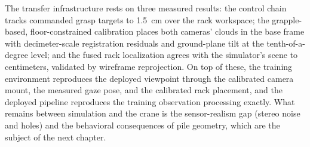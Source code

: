 The transfer infrastructure rests on three measured results: the control
chain tracks commanded grasp targets to 1.5~cm over the rack workspace; the
grapple-based, floor-constrained calibration places both cameras' clouds in
the base frame with decimeter-scale registration residuals and ground-plane
tilt at the tenth-of-a-degree level; and the fused rack localization agrees
with the simulator's scene to centimeters, validated by wireframe
reprojection. On top of these, the training environment reproduces the
deployed viewpoint through the calibrated camera mount, the measured gaze
pose, and the calibrated rack placement, and the deployed pipeline
reproduces the training observation processing exactly. What remains between
simulation and the crane is the sensor-realism gap (stereo noise and holes)
and the behavioral consequences of pile geometry, which are the subject of
the next chapter.
